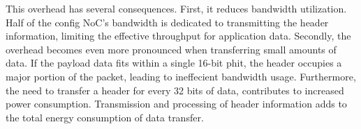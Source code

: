 This overhead has several consequences.
First, it reduces bandwidth utilization.
Half of the config NoC's bandwidth is dedicated to transmitting the header information, limiting the effective throughput for application data.
Secondly, the overhead becomes even more pronounced when transferring small amounts of data.
If the payload data fits within a single 16-bit phit, the header occupies a major portion of the packet, leading to ineffecient bandwidth usage.
Furthermore, the need to transfer a header for every 32 bits of data, contributes to increased power consumption.
Transmission and processing of header information adds to the total energy consumption of data transfer.
